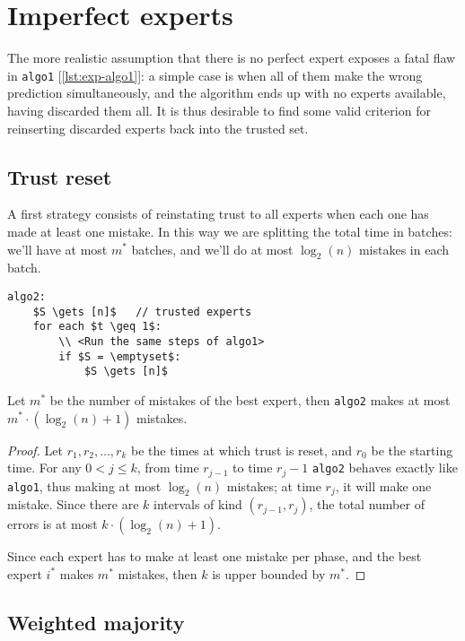 \section{Imperfect experts}

The more realistic assumption that there is no perfect expert exposes a fatal flaw in \texttt{algo1} [\ref{lst:exp-algo1}]: a simple case is when all of them make the wrong prediction simultaneously, and the algorithm ends up with no experts available, having discarded them all. It is thus desirable to find some valid criterion for reinserting discarded experts back into the trusted set.


\subsection{Trust reset}

A first strategy consists of reinstating trust to all experts when each one has made at least one mistake. In this way we are splitting the total time in batches: we'll have at most $m^*$ batches, and we'll do at most $\log_2(n)$ mistakes in each batch.
\begin{lstlisting}[caption = {Algo 2}, label = {lst:exp-algo2}]
algo2:
    $S \gets [n]$   // trusted experts
    for each $t \geq 1$:
        \\ <Run the same steps of algo1>
        if $S = \emptyset$:
            $S \gets [n]$
\end{lstlisting}

\begin{lemma}\label{lem:exp-algo2-errors}
    Let $m^*$ be the number of mistakes of the best expert, then \texttt{algo2} makes at most $m^* \cdot (\log_2(n) + 1)$ mistakes.
\end{lemma}
\begin{proof}
    Let $r_1, r_2, \ldots, r_k$ be the times at which trust is reset, and $r_0$ be the starting time. For any $0 < j \leq k$, from time $r_{j - 1}$ to time $r_j - 1$ \texttt{algo2} behaves exactly like \texttt{algo1}, thus making at most $\log_2(n)$ mistakes; at time $r_j$, it will make one mistake. Since there are $k$ intervals of kind $(r_{j - 1}, r_j)$, the total number of errors is at most $k \cdot (\log_2(n) + 1)$.

    Since each expert has to make at least one mistake per phase, and the best expert $i^*$ makes $m^*$ mistakes, then $k$ is upper bounded by $m^*$.
\end{proof}


\subsection{Weighted majority}

